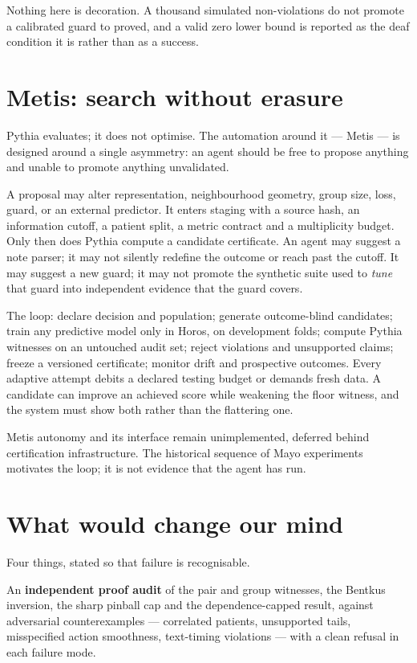 \documentclass[11pt,a4paper]{article}
\newcommand{\tier}[1]{\textsf{\small#1}}
\begin{document}
Nothing here is decoration. A thousand simulated non-violations do not promote a \tier{calibrated} guard to \tier{proved}, and a valid zero lower bound is reported as the deaf condition it is rather than as a success.

\section{Metis: search without erasure}

Pythia evaluates; it does not optimise. The automation around it --- Metis --- is designed around a single asymmetry: an agent should be free to propose anything and unable to promote anything unvalidated.

A proposal may alter representation, neighbourhood geometry, group size, loss, guard, or an external predictor. It enters staging with a source hash, an information cutoff, a patient split, a metric contract and a multiplicity budget. Only then does Pythia compute a candidate certificate. An agent may suggest a note parser; it may not silently redefine the outcome or reach past the cutoff. It may suggest a new guard; it may not promote the synthetic suite used to \emph{tune} that guard into independent evidence that the guard covers.

The loop: declare decision and population; generate outcome-blind candidates; train any predictive model only in Horos, on development folds; compute Pythia witnesses on an untouched audit set; reject violations and unsupported claims; freeze a versioned certificate; monitor drift and prospective outcomes. Every adaptive attempt debits a declared testing budget or demands fresh data. A candidate can improve an achieved score while weakening the floor witness, and the system must show both rather than the flattering one.

Metis autonomy and its interface remain unimplemented, deferred behind certification infrastructure. The historical sequence of Mayo experiments motivates the loop; it is not evidence that the agent has run.

\section{What would change our mind}

Four things, stated so that failure is recognisable.

An \textbf{independent proof audit} of the pair and group witnesses, the Bentkus inversion, the sharp pinball cap and the dependence-capped result, against adversarial counterexamples --- correlated patients, unsupported tails, misspecified action smoothness, text-timing violations --- with a clean refusal in each failure mode.
\end{document}
